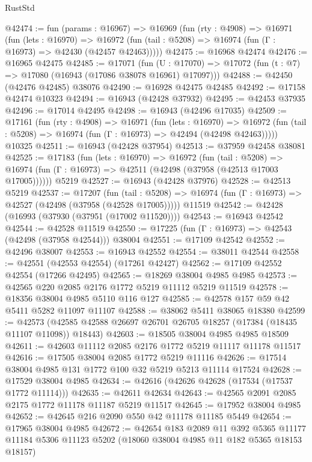 \begin{lexlean}{RustStd}
\begin{coremodule}
@42474 := fun (params : @16967) =>
  @16969
    (fun (rty : @4908) =>
    @16971
      (fun (lets : @16970) =>
      @16972 (fun (tail : @5208) => @16974 (fun (Γ : @16973) => @42430 (@42457 @42463)))))
@42475 := @16968 @42474
@42476 := @16965 @42475
@42485 := @17071
    (fun (U : @17070) => @17072 (fun (t : @7) => @17080 (@16943 (@17086 @38078 @16961) @17097)))
@42488 := @42450 (@42476 @42485) @38076
@42490 := @16928 @42475 @42485
@42492 := @17158 @42474 @10323
@42494 := @16943 (@42428 @37932)
@42495 := @42453 @37935
@42496 := @17014 @42495
@42498 := @16943 (@42496 @17035)
@42509 := @17161
    (fun (rty : @4908) =>
    @16971
      (fun (lets : @16970) =>
      @16972 (fun (tail : @5208) => @16974 (fun (Γ : @16973) => @42494 (@42498 @42463)))))
    @10325
@42511 := @16943 (@42428 @37954)
@42513 := @37959 @42458 @38081
@42525 := @17183
    (fun (lets : @16970) =>
    @16972
      (fun (tail : @5208) =>
      @16974 (fun (Γ : @16973) => @42511 (@42498 (@37958 (@42513 @17003 @17005))))))
    @5219
@42527 := @16943 (@42428 @37976)
@42528 := @42513 @5219
@42537 := @17207
    (fun (tail : @5208) => @16974 (fun (Γ : @16973) => @42527 (@42498 (@37958 (@42528 @17005)))))
    @11519
@42542 := @42428 (@16993 (@37930 (@37951 (@17002 @11520))))
@42543 := @16943 @42542
@42544 := @42528 @11519
@42550 := @17225 (fun (Γ : @16973) => @42543 (@42498 (@37958 @42544))) @38004
@42551 := @17109 @42542
@42552 := @42496 @38007
@42553 := @16943 @42552
@42554 := @38011 @42544
@42558 := @42551 (@42553 @42554) (@17261 @42427)
@42562 := @17109 @42552 @42554 (@17266 @42495)
@42565 := @18269 @38004 @4985 @4985
@42573 := @42565 @220 @2085 @2176 @1772 @5219 @11112 @5219 @11519
@42578 := @18356 @38004 @4985 @5110 @116 @127
@42585 := @42578 @157 @59 @42 @5411 @5282 @11097 @11107
@42588 := @38062 @5411 @38065 @18380
@42599 := @42573 (@42585 @42588 @26697 @26701 @26705 @18257 (@17384 (@18435 @11107 @11098)) @18443)
@42603 := @18505 @38004 @4985 @4985 @18509
@42611 := @42603 @11112 @2085 @2176 @1772 @5219 @11117 @11178 @11517
@42616 := @17505 @38004 @2085 @1772 @5219 @11116
@42626 := @17514 @38004 @4985 @131 @1772 @100 @32 @5219 @5213 @11114 @17524
@42628 := @17529 @38004 @4985
@42634 := @42616 (@42626 @42628 (@17534 (@17537 @1772 @11114)))
@42635 := @42611 @42634
@42643 := @42565 @2091 @2085 @2175 @1772 @11178 @11187 @5219 @11517
@42645 := @17952 @38004 @4985
@42652 := @42645 @216 @2090 @550 @42 @11178 @11185 @5449
@42654 := @17965 @38004 @4985
@42672 := @42654
    @183
    @2089
    @11
    @392
    @5365
    @11177
    @11184
    @5306
    @11123
    @5202
    (@18060 @38004 @4985 @11 @182 @5365 @18153 @18157)

\end{coremodule}
\end{lexlean}

